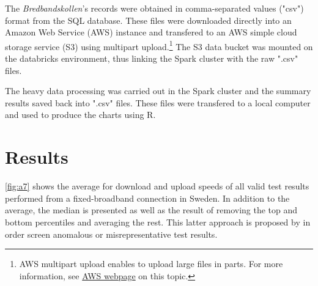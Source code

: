 \documentclass[12pt]{article}
\begin{document}
The \textit{Bredbandskollen}'s records were obtained in comma-separated values ("csv") format from the SQL database. These files were downloaded directly into an Amazon Web Service (AWS) instance and transfered to an AWS simple cloud storage service (S3) using multipart upload.\footnote{AWS multipart upload enables to upload large files in parts. For more information, see \href{http://docs.aws.amazon.com/AmazonS3/latest/dev/mpuoverview.html}{AWS webpage} on this topic.} The S3 data bucket was mounted on the databricks environment, thus linking the Spark cluster with the raw ".csv" files.

The heavy data processing was carried out in the Spark cluster and the summary results saved back into ".csv" files. These files were transfered to a local computer and used to produce the charts using R. 

\section{Results} \label{res}
\autoref{fig:a7} shows the average for download and upload speeds of all valid test results performed from a fixed-broadband connection in Sweden. In addition to the average, the median is presented as well as the result of removing the top and bottom percentiles and averaging the rest. This latter approach is proposed by \cite{samknows2013} in order screen anomalous or misrepresentative test results. 
\end{document}
